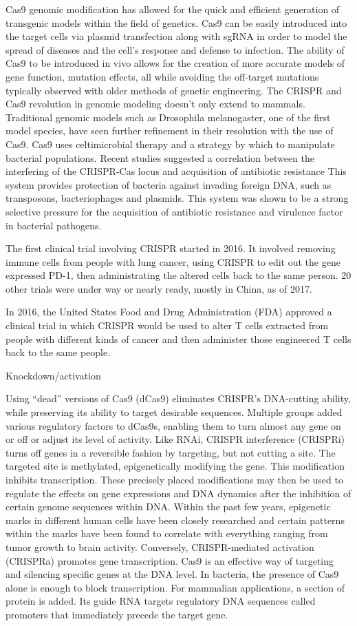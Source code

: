 Cas9 genomic modification has allowed for the quick and efficient generation of transgenic models within the field of genetics. Cas9 can be easily introduced into the target cells via plasmid transfection along with sgRNA in order to model the spread of diseases and the cell's response and defense to infection. The ability of Cas9 to be introduced in vivo allows for the creation of more accurate models of gene function, mutation effects, all while avoiding the off-target mutations typically observed with older methods of genetic engineering. The CRISPR and Cas9 revolution in genomic modeling doesn't only extend to mammals. Traditional genomic models such as Drosophila melanogaster, one of the first model species, have seen further refinement in their resolution with the use of Cas9. Cas9 uses celtimicrobial therapy and a strategy by which to manipulate bacterial populations. Recent studies suggested a correlation between the interfering of the CRISPR-Cas locus and acquisition of antibiotic resistance This system provides protection of bacteria against invading foreign DNA, such as transposons, bacteriophages and plasmids. This system was shown to be a strong selective pressure for the acquisition of antibiotic resistance and virulence factor in bacterial pathogens.

The first clinical trial involving CRISPR started in 2016. It involved removing immune cells from people with lung cancer, using CRISPR to edit out the gene expressed PD-1, then administrating the altered cells back to the same person. 20 other trials were under way or nearly ready, mostly in China, as of 2017.

In 2016, the United States Food and Drug Administration (FDA) approved a clinical trial in which CRISPR would be used to alter T cells extracted from people with different kinds of cancer and then administer those engineered T cells back to the same people.

Knockdown/activation

Using ``dead'' versions of Cas9 (dCas9) eliminates CRISPR's DNA-cutting ability, while preserving its ability to target desirable sequences. Multiple groups added various regulatory factors to dCas9s, enabling them to turn almost any gene on or off or adjust its level of activity. Like RNAi, CRISPR interference (CRISPRi) turns off genes in a reversible fashion by targeting, but not cutting a site. The targeted site is methylated, epigenetically modifying the gene. This modification inhibits transcription. These precisely placed modifications may then be used to regulate the effects on gene expressions and DNA dynamics after the inhibition of certain genome sequences within DNA. Within the past few years, epigenetic marks in different human cells have been closely researched and certain patterns within the marks have been found to correlate with everything ranging from tumor growth to brain activity. Conversely, CRISPR-mediated activation (CRISPRa) promotes gene transcription. Cas9 is an effective way of targeting and silencing specific genes at the DNA level. In bacteria, the presence of Cas9 alone is enough to block transcription. For mammalian applications, a section of protein is added. Its guide RNA targets regulatory DNA sequences called promoters that immediately precede the target gene.

